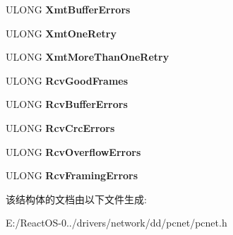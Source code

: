 \begin{DoxyCompactItemize}
U\+L\+O\+NG {\bfseries Xmt\+Buffer\+Errors}
\item 
\mbox{\label{struct___a_d_a_p_t_e_r___s_t_a_t_s_a1850e39ab183b587ebece770bc713f98}} 
U\+L\+O\+NG {\bfseries Xmt\+One\+Retry}
\item 
\mbox{\label{struct___a_d_a_p_t_e_r___s_t_a_t_s_a9e312e9f3d4681ba4dc451187b5e2e37}} 
U\+L\+O\+NG {\bfseries Xmt\+More\+Than\+One\+Retry}
\item 
\mbox{\label{struct___a_d_a_p_t_e_r___s_t_a_t_s_a96a67f8ec99c3e863da9e0443fe993d2}} 
U\+L\+O\+NG {\bfseries Rcv\+Good\+Frames}
\item 
\mbox{\label{struct___a_d_a_p_t_e_r___s_t_a_t_s_a590d64e51f6a2923baf95c9dcf37abfd}} 
U\+L\+O\+NG {\bfseries Rcv\+Buffer\+Errors}
\item 
\mbox{\label{struct___a_d_a_p_t_e_r___s_t_a_t_s_a191024deadd3cb53d6cf6f5856e56c28}} 
U\+L\+O\+NG {\bfseries Rcv\+Crc\+Errors}
\item 
\mbox{\label{struct___a_d_a_p_t_e_r___s_t_a_t_s_a7e0e0cb075d1e0863d5c45bbcfcb85e5}} 
U\+L\+O\+NG {\bfseries Rcv\+Overflow\+Errors}
\item 
\mbox{\label{struct___a_d_a_p_t_e_r___s_t_a_t_s_a77efce1369ac4213fcb74ff26033f82b}} 
U\+L\+O\+NG {\bfseries Rcv\+Framing\+Errors}
\end{DoxyCompactItemize}


该结构体的文档由以下文件生成\+:\begin{DoxyCompactItemize}
\item 
E\+:/\+React\+O\+S-\/0../drivers/network/dd/pcnet/pcnet.\+h\end{DoxyCompactItemize}
